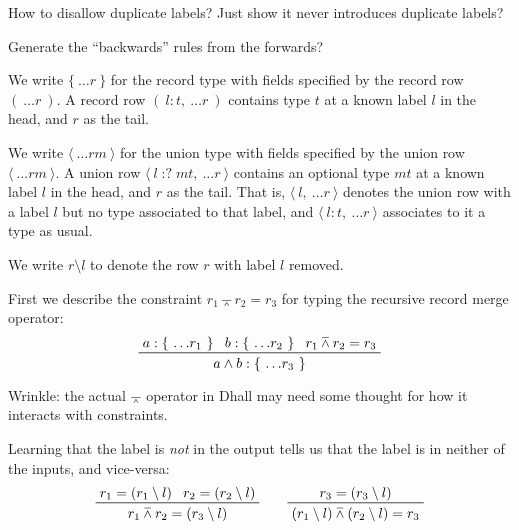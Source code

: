 \documentclass[11pt, twoside, reqno]{book}
\providecommand{\lcurvyangle}{\langle}
\providecommand{\rcurvyangle}{\rangle}
\providecommand{\wedgeonwedge}{\barwedge}
\begin{document}
\begin{mdframed}[style=TODO]
How to disallow duplicate labels?
Just show it never introduces duplicate labels?
\end{mdframed}

\begin{mdframed}[style=TODO]
Generate the ``backwards'' rules from the forwards?
\end{mdframed}

We write \(\{\ \dots\!r\ \}\) for the record type with fields specified by the record row \((\ \dots\!r\ )\).
A record row \((\ l : t,\ \dots\!r\ )\) contains type \(t\) at a known label \(l\) in the head, and \(r\) as the tail.

We write \(\langle\ \dots\!\mathit{rm}\ \rangle\) for the union type with fields specified by the union row \(\lcurvyangle\ \dots\!\mathit{rm}\ \rcurvyangle\).
A union row $\lcurvyangle\ l \mathop{{:}{?}} \mathit{mt},\ \dots\!r\ \rcurvyangle$ contains an optional type \(\mathit{mt}\) at a known label \(l\) in the head, and \(r\) as the tail.
That is, \(\lcurvyangle\ l,\ \dots\!r\ \rcurvyangle\) denotes the union row with a label \(l\) but no type associated to that label, and \(\lcurvyangle\ l : t,\ \dots\!r\ \rcurvyangle\) associates to it a type as usual.

We write \(r \setminus l\) to denote the row \(r\) with label \(l\) removed.

First we describe the constraint \(r_1 \wedgeonwedge r_2 = r_3\) for typing the recursive record merge operator:
\begin{displaymath}
\prftree{a : \{\ \dots\!r_1\ \}}{b : \{\ \dots\!r_2\ \}}{r_1 \wedgeonwedge r_2 = r_3}{a \land b : \{\ \dots\!r_3\ \}}
\end{displaymath}

\begin{mdframed}[style=TODO]
Wrinkle: the actual \(\wedgeonwedge\) operator in Dhall may need some thought for how it interacts with constraints.
\end{mdframed}

Learning that the label is \emph{not} in the output tells us that the label is in neither of the inputs, and vice-versa:
\begin{displaymath}
\prftree{r_1 = (r_1 \setminus l)}{r_2 = (r_2 \setminus l)}{r_1 \wedgeonwedge r_2 = (r_3 \setminus l)}
\qquad
\prftree{r_3 = (r_3 \setminus l)}{(r_1 \setminus l) \wedgeonwedge (r_2 \setminus l) = r_3}
\end{displaymath}
\end{document}
